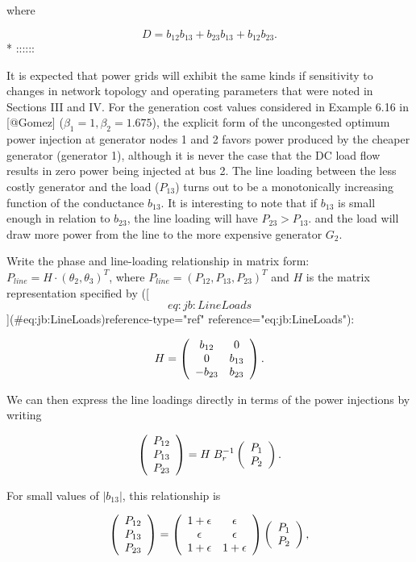 where

$$D= b_{12} b_{13}+b_{23} b_{13}+b_{12} b_{23}.$$* ::::::

It is expected that power grids will exhibit the same kinds if sensitivity to changes in network topology and operating parameters that were noted in Sections III and IV. For the generation cost values considered in Example 6.16 in [@Gomez] ($\beta_1=1,\beta_2=1.675$), the explicit form of the uncongested optimum power injection at generator nodes 1 and 2 favors power produced by the cheaper generator (generator 1), although it is never the case that the DC load flow results in zero power being injected at bus 2. The line loading between the less costly generator and the load ($P_{13}$) turns out to be a monotonically increasing function of the conductance $b_{13}$. It is interesting to note that if $b_{13}$ is small enough in relation to $b_{23}$, the line loading will have $P_{23}>P_{13}$. and the load will draw more power from the line to the more expensive generator $G_2$.

Write the phase and line-loading relationship in matrix form: $P_{line}= H\cdot (\theta_2,\theta_3)^T$, where $P_{line}=(P_{12},P_{13},P_{23})^T$ and $H$ is the matrix representation specified by ([\[eq:jb:LineLoads\]](#eq:jb:LineLoads){reference-type="ref" reference="eq:jb:LineLoads"}):

$$H=\left(\begin{array}{cc} b_{12} & 0\cr 0& b_{13}\cr -b_{23} & b_{23} \end{array}\right).$$

We can then express the line loadings directly in terms of the power injections by writing

$$\left(\begin{array}{c} P_{12}\cr P_{13} \cr P_{23} \end{array} \right) = H\;B_r^{-1} \left(\begin{array}{c} P_1\cr P_2 \end{array}\right).$$

For small values of $|b_{13}|$, this relationship is

$$\left(\begin{array}{c} P_{12}\cr P_{13} \cr P_{23} \end{array} \right) =\left(\begin{array}{cc} 1+  \epsilon & \epsilon \cr
 \epsilon & \epsilon \cr
 1+  \epsilon & 1+  \epsilon \end{array}\right)
 \left(\begin{array}{c} P_1\cr P_2 \end{array}\right),$$

